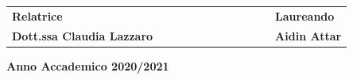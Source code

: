\begin{titlepage}
	\vspace{20mm} %
	
	\begin{spacing}{2}
		\begin{tabular}{ l  c  c c c  cc c c c c  l }
			{\Large{\bf Relatrice}} &&&&&&&&&&& {\Large{\bf Laureando}}\\
			{\Large{\bf Dott.ssa Claudia Lazzaro}} &&&&&&&&&&& {\Large{\bf Aidin Attar}}\\
		\end{tabular}
	\end{spacing}
	\vspace{15 mm} %
	
	\begin{center}
		{\Large{\bf Anno Accademico 2020/2021}}
	\end{center}
\end{titlepage}
\clearpage

\begin{Abstract}
	\begin{changemargin}{1cm}{1cm}
		\lipsum[10]
	\end{changemargin}
\end{Abstract}

\tableofcontents